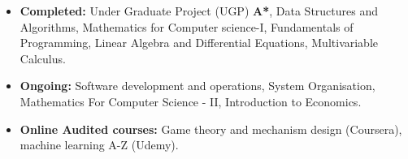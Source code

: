 

\begin{itemize}
\item {\textbf{Completed:} Under Graduate Project (UGP) \textbf{A*}, Data Structures and Algorithms, Mathematics for Computer
science-I, Fundamentals of Programming, Linear Algebra and Differential Equations, Multivariable Calculus.}
\item {\textbf{Ongoing:} Software development and operations, System Organisation, Mathematics For Computer Science - II, Introduction to Economics.}
\item {\textbf{Online Audited courses:} Game theory and mechanism design (Coursera), machine learning A-Z (Udemy).}
\end{itemize}